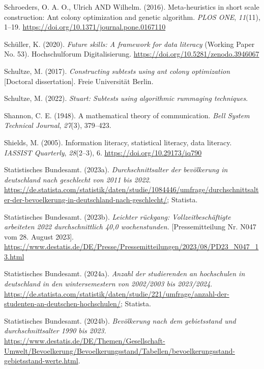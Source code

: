 \documentclass[
  12pt,
  a4paper,
  twoside]{article}
\newlength{\cslhangindent}
\newenvironment{CSLReferences}[2] %
 {\begin{list}{}{%
  \setlength{\itemindent}{0pt}
  \setlength{\leftmargin}{0pt}
  \setlength{\parsep}{0pt}
  \ifodd #1
   \setlength{\leftmargin}{\cslhangindent}
   \setlength{\itemindent}{-1\cslhangindent}
  \fi
  \setlength{\itemsep}{#2\baselineskip}}}
 {\end{list}}
\begin{document}
\begin{CSLReferences}{1}{0}
Schroeders, O. A. O., Ulrich AND Wilhelm. (2016). Meta-heuristics in short scale construction: Ant colony optimization and genetic algorithm. \emph{PLOS ONE}, \emph{11}(11), 1--19. \url{https://doi.org/10.1371/journal.pone.0167110}

Schüller, K. (2020). \emph{Future skills: A framework for data literacy} (Working Paper No. 53). Hochschulforum Digitalisierung. \url{https://doi.org/10.5281/zenodo.3946067}

Schultze, M. (2017). \emph{Constructing subtests using ant colony optimization} {[}Doctoral dissertation{]}. Freie Universität Berlin.

Schultze, M. (2022). \emph{Stuart: Subtests using algorithmic rummaging techniques}.

Shannon, C. E. (1948). A mathematical theory of communication. \emph{Bell System Technical Journal}, \emph{27}(3), 379--423.

Shields, M. (2005). Information literacy, statistical literacy, data literacy. \emph{IASSIST Quarterly}, \emph{28}(2--3), 6. \url{https://doi.org/10.29173/iq790}

Statistisches Bundesamt. (2023a). \emph{Durchschnittsalter der bevölkerung in deutschland nach geschlecht von 2011 bis 2022}. \url{https://de.statista.com/statistik/daten/studie/1084446/umfrage/durchschnittsalter-der-bevoelkerung-in-deutschland-nach-geschlecht/}; Statista.

Statistisches Bundesamt. (2023b). \emph{Leichter rückgang: Vollzeitbeschäftigte arbeiteten 2022 durchschnittlich 40,0 wochenstunden.} {[}Pressemitteilung Nr. N047 vom 28. August 2023{]}. \url{https://www.destatis.de/DE/Presse/Pressemitteilungen/2023/08/PD23_N047_13.html}

Statistisches Bundesamt. (2024a). \emph{Anzahl der studierenden an hochschulen in deutschland in den wintersemestern von 2002/2003 bis 2023/2024}. \url{https://de.statista.com/statistik/daten/studie/221/umfrage/anzahl-der-studenten-an-deutschen-hochschulen/}; Statista.

Statistisches Bundesamt. (2024b). \emph{Bevölkerung nach dem gebietsstand und durchschnitts­alter 1990 bis 2023.} \url{https://www.destatis.de/DE/Themen/Gesellschaft-Umwelt/Bevoelkerung/Bevoelkerungsstand/Tabellen/bevoelkerungsstand-gebietsstand-werte.html}.


\end{CSLReferences}
\end{document}
